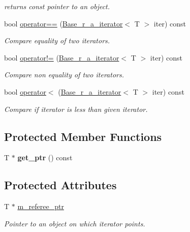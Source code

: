 \begin{DoxyCompactItemize}
\begin{DoxyCompactList}\small\item\em returns const pointer to an object. \end{DoxyCompactList}\item 
bool \hyperlink{classtasks_1_1Base__r__a__iterator_ad5764a2e6f21f0382e962716f42b620a}{operator==} (\hyperlink{classtasks_1_1Base__r__a__iterator}{Base\+\_\+r\+\_\+a\+\_\+iterator}$<$ T $>$ iter) const 
\begin{DoxyCompactList}\small\item\em Compare equality of two iterators. \end{DoxyCompactList}\item 
bool \hyperlink{classtasks_1_1Base__r__a__iterator_a0209f049a7a83293b053be20fa515c0c}{operator!=} (\hyperlink{classtasks_1_1Base__r__a__iterator}{Base\+\_\+r\+\_\+a\+\_\+iterator}$<$ T $>$ iter) const 
\begin{DoxyCompactList}\small\item\em Compare non equality of two iterators. \end{DoxyCompactList}\item 
bool \hyperlink{classtasks_1_1Base__r__a__iterator_ae41b918686e4128f442d68d0f00964bc}{operator$<$} (\hyperlink{classtasks_1_1Base__r__a__iterator}{Base\+\_\+r\+\_\+a\+\_\+iterator}$<$ T $>$ iter) const 
\begin{DoxyCompactList}\small\item\em Compare if iterator is less than given iterator. \end{DoxyCompactList}\end{DoxyCompactItemize}
\subsection*{Protected Member Functions}
\begin{DoxyCompactItemize}
\item 
T $\ast$ {\bfseries get\+\_\+ptr} () const \hypertarget{classtasks_1_1Base__r__a__iterator_aab981e64d35bfca643c7b110c1de27e0}{}\label{classtasks_1_1Base__r__a__iterator_aab981e64d35bfca643c7b110c1de27e0}

\end{DoxyCompactItemize}
\subsection*{Protected Attributes}
\begin{DoxyCompactItemize}
\item 
T $\ast$ \hyperlink{classtasks_1_1Base__r__a__iterator_ab81bb3ae44d8d6c43b58832743529320}{m\+\_\+referee\+\_\+ptr}\hypertarget{classtasks_1_1Base__r__a__iterator_ab81bb3ae44d8d6c43b58832743529320}{}\label{classtasks_1_1Base__r__a__iterator_ab81bb3ae44d8d6c43b58832743529320}

\begin{DoxyCompactList}\small\item\em Pointer to an object on which iterator points. \end{DoxyCompactList}\end{DoxyCompactItemize}
